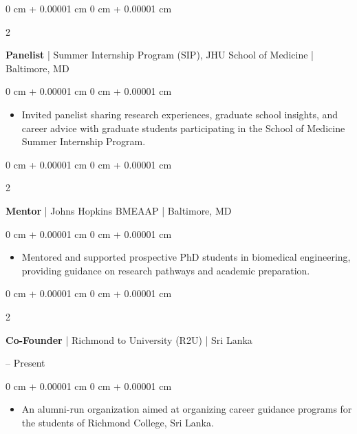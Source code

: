 \documentclass[10pt, letterpaper]{article}
\newenvironment{highlights}{
    \begin{itemize}[
        topsep=0.10 cm,
        parsep=0.10 cm,
        partopsep=0pt,
        itemsep=0pt,
        leftmargin=0 cm + 10pt
    ]
}{
    \end{itemize}
} %
\newenvironment{onecolentry}{
    \begin{adjustwidth}{
        0 cm + 0.00001 cm
    }{
        0 cm + 0.00001 cm
    }
}{
    \end{adjustwidth}
} %
\newenvironment{twocolentry}[2][]{
    \onecolentry
    \def\secondColumn{#2}
    \setcolumnwidth{\fill, 4.5 cm}
    \begin{paracol}{2}
}{
    \switchcolumn \raggedleft \secondColumn\strut
    \end{paracol}
    \endonecolentry
} %
\begin{document}
    \vspace{0.2 cm}

    \begin{twocolentry}{2026}
    \textbf{Panelist} | Summer Internship Program (SIP), JHU School of Medicine | Baltimore, MD
    \end{twocolentry}
    \vspace{0.10 cm}
    \begin{onecolentry}
        \begin{highlights}
            \item Invited panelist sharing research experiences, graduate school insights, and career advice with graduate students participating in the School of Medicine Summer Internship Program.
        \end{highlights}
    \end{onecolentry}

    \vspace{0.2 cm}

    \begin{twocolentry}{2024}
    \textbf{Mentor} | Johns Hopkins BMEAAP | Baltimore, MD
    \end{twocolentry}
    \vspace{0.10 cm}
    \begin{onecolentry}
        \begin{highlights}
            \item Mentored and supported prospective PhD students in biomedical engineering, providing guidance on research pathways and academic preparation.
        \end{highlights}
    \end{onecolentry}

    \vspace{0.2 cm}

    \begin{twocolentry}{2018 -- Present}
    \textbf{Co-Founder} | Richmond to University (R2U) | Sri Lanka
    \end{twocolentry}
    \vspace{0.10 cm}
    \begin{onecolentry}
        \begin{highlights}
            \item An alumni-run organization aimed at organizing career guidance programs for the students of Richmond College, Sri Lanka.
        \end{highlights}
    \end{onecolentry}
\end{document}
